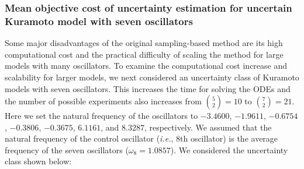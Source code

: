 \documentclass{article}
\begin{document}
\subsubsection{Mean objective cost of uncertainty estimation for uncertain Kuramoto model with seven oscillators}
\label{MOCU7} 
Some major disadvantages of the original sampling-based method are its high computational cost and the practical difficulty of scaling the method for large models with many oscillators. To examine the computational cost increase and scalability for larger models, we next considered an uncertainty class of Kuramoto models with seven oscillators. This increases the time for solving the ODEs and the number of possible experiments also increases from ${5\choose 2} = 10$ to ${7\choose 2} = 21$. Here we set the natural frequency of the oscillators to $-3.4600$, $-1.9611$, $-0.6754$, $-0.3806$, $-0.3675$, $6.1161$, and $8.3287$, respectively. We assumed that the natural frequency of the control oscillator (\textit{i.e.}, $8$th oscillator) is the average frequency of the seven oscillators (${\omega_{8} = 1.0857}$). We considered the uncertainty class shown below:
\end{document}
